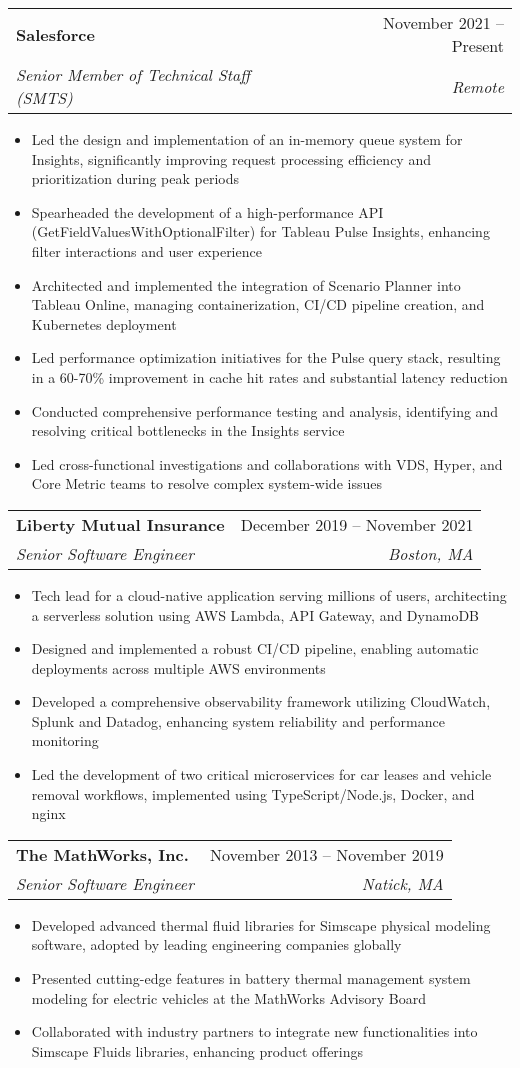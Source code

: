 \documentclass[letterpaper,11pt]{article}
\makeatletter
\newcommand{\resumeItem}[1]{
  \item\small{
    {#1 \vspace{-2pt}}
  }
}
\newcommand{\resumeSubheading}[4]{
  \vspace{-2pt}\item
    \begin{tabular*}{0.97\textwidth}[t]{l@{\extracolsep{\fill}}r}
      \textbf{#1} & #2 \\
      \textit{\small#3} & \textit{\small #4} \\
    \end{tabular*}\vspace{-7pt}
}
\newcommand{\resumeItemListStart}{\begin{itemize}}
\newcommand{\resumeItemListEnd}{\end{itemize}\vspace{-5pt}}
\makeatother
\begin{document}
  \resumeSubheading
    {Salesforce}{November 2021 -- Present}
    {Senior Member of Technical Staff (SMTS)}{Remote}
    \resumeItemListStart
        \resumeItem{Led the design and implementation of an in-memory queue system for Insights, significantly improving request processing efficiency and prioritization during peak periods}
        \resumeItem{Spearheaded the development of a high-performance API (GetFieldValuesWithOptionalFilter) for Tableau Pulse Insights, enhancing filter interactions and user experience}
        \resumeItem{Architected and implemented the integration of Scenario Planner into Tableau Online, managing containerization, CI/CD pipeline creation, and Kubernetes deployment}
        \resumeItem{Led performance optimization initiatives for the Pulse query stack, resulting in a 60-70\% improvement in cache hit rates and substantial latency reduction}
        \resumeItem{Conducted comprehensive performance testing and analysis, identifying and resolving critical bottlenecks in the Insights service}
        \resumeItem{Led cross-functional investigations and collaborations with VDS, Hyper, and Core Metric teams to resolve complex system-wide issues}
    \resumeItemListEnd

  \resumeSubheading
    {Liberty Mutual Insurance}{December 2019 -- November 2021}
    {Senior Software Engineer}{Boston, MA}
    \resumeItemListStart
        \resumeItem{Tech lead for a cloud-native application serving millions of users, architecting a serverless solution using AWS Lambda, API Gateway, and DynamoDB}
        \resumeItem{Designed and implemented a robust CI/CD pipeline, enabling automatic deployments across multiple AWS environments}
        \resumeItem{Developed a comprehensive observability framework utilizing CloudWatch, Splunk and Datadog, enhancing system reliability and performance monitoring}
        \resumeItem{Led the development of two critical microservices for car leases and vehicle removal workflows, implemented using TypeScript/Node.js, Docker, and nginx}
    \resumeItemListEnd

  \resumeSubheading
    {The MathWorks, Inc.}{November 2013 -- November 2019}
    {Senior Software Engineer}{Natick, MA}
    \resumeItemListStart
        \resumeItem{Developed advanced thermal fluid libraries for Simscape physical modeling software, adopted by leading engineering companies globally}
        \resumeItem{Presented cutting-edge features in battery thermal management system modeling for electric vehicles at the MathWorks Advisory Board}
        \resumeItem{Collaborated with industry partners to integrate new functionalities into Simscape Fluids libraries, enhancing product offerings}
    \resumeItemListEnd
\end{document}
